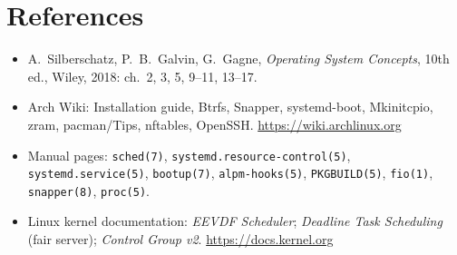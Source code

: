 \documentclass[10.5pt,a4paper]{article}
\newcommand{\cmd}[1]{\texttt{#1}}
\begin{document}
\section*{References}
\small
\begin{itemize}[leftmargin=*]
\item A.~Silberschatz, P.~B.~Galvin, G.~Gagne, \emph{Operating System Concepts}, 10th ed., Wiley, 2018: ch.~2, 3, 5, 9–11, 13–17.
\item Arch Wiki: Installation guide, Btrfs, Snapper, systemd-boot, Mkinitcpio, zram, pacman/Tips, nftables, OpenSSH. \url{https://wiki.archlinux.org}
\item Manual pages: \cmd{sched(7)}, \cmd{systemd.resource-control(5)}, \cmd{systemd.service(5)}, \cmd{bootup(7)}, \cmd{alpm-hooks(5)}, \cmd{PKGBUILD(5)}, \cmd{fio(1)}, \cmd{snapper(8)}, \cmd{proc(5)}.
\item Linux kernel documentation: \emph{EEVDF Scheduler}; \emph{Deadline Task Scheduling} (fair server); \emph{Control Group v2}. \url{https://docs.kernel.org}
\end{itemize}
\end{document}
